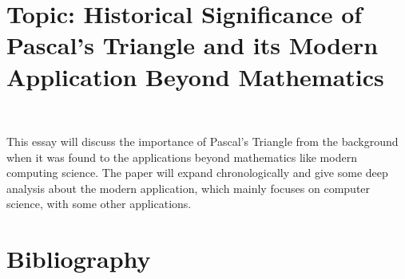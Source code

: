 \documentclass{article}
\begin{document}
\section*{Topic: Historical Significance of Pascal's Triangle and its Modern Application Beyond Mathematics}

~

This essay will discuss the importance of Pascal's Triangle from the background when it was found to the applications beyond mathematics like modern computing science. The paper will expand chronologically and give some deep analysis about the modern application, which mainly focuses on computer science, with some other applications.

\newpage

\section*{Bibliography}
\end{document}
